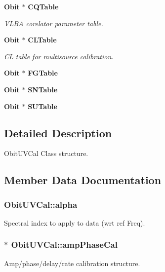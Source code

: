 \begin{CompactItemize}
{\bf Obit} $\ast$ {\bf CQTable}
\begin{CompactList}\small\item\em VLBA corelator parameter table. \item\end{CompactList}\item 
{\bf Obit} $\ast$ {\bf CLTable}
\begin{CompactList}\small\item\em CL table for multisource calibration. \item\end{CompactList}\item 
{\bf Obit} $\ast$ {\bf FGTable}
\item 
{\bf Obit} $\ast$ {\bf SNTable}
\item 
{\bf Obit} $\ast$ {\bf SUTable}
\end{CompactItemize}


\subsection{Detailed Description}
Obit\-UVCal Class structure. 



\subsection{Member Data Documentation}
\subsubsection{ {\bf Obit\-UVCal::alpha}}\label{structObitUVCal_o28}


Spectral index to apply to data (wrt ref Freq). 

\subsubsection{$\ast$ {\bf Obit\-UVCal::amp\-Phase\-Cal}}\label{structObitUVCal_o39}


Amp/phase/delay/rate calibration structure. 

